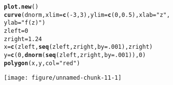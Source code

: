 \documentclass{article}\usepackage[]{graphicx}\usepackage[]{xcolor}
\makeatletter
\def\maxwidth{ %
  \ifdim\Gin@nat@width>\linewidth
    \linewidth
  \else
    \Gin@nat@width
  \fi
}
\newcommand{\hlnum}[1]{\textcolor[rgb]{0.686,0.059,0.569}{#1}}%
\newcommand{\hlsng}[1]{\textcolor[rgb]{0.192,0.494,0.8}{#1}}%
\newcommand{\hlopt}[1]{\textcolor[rgb]{0,0,0}{#1}}%
\newcommand{\hldef}[1]{\textcolor[rgb]{0.345,0.345,0.345}{#1}}%
\newcommand{\hlkwb}[1]{\textcolor[rgb]{0.69,0.353,0.396}{#1}}%
\newcommand{\hlkwc}[1]{\textcolor[rgb]{0.333,0.667,0.333}{#1}}%
\newcommand{\hlkwd}[1]{\textcolor[rgb]{0.737,0.353,0.396}{\textbf{#1}}}%
\newenvironment{kframe}{%
 \def\at@end@of@kframe{}%
 \ifinner\ifhmode%
  \def\at@end@of@kframe{\end{minipage}}%
  \begin{minipage}{\columnwidth}%
 \fi\fi%
 \def\FrameCommand##1{\hskip\@totalleftmargin \hskip-\fboxsep
 \colorbox{shadecolor}{##1}\hskip-\fboxsep
     \hskip-\linewidth \hskip-\@totalleftmargin \hskip\columnwidth}%
 \MakeFramed {\advance\hsize-\width
   \@totalleftmargin\z@ \linewidth\hsize
   \@setminipage}}%
 {\par\unskip\endMakeFramed%
 \at@end@of@kframe}
\newenvironment{knitrout}{}{} %
\makeatother
\begin{document}
\begin{knitrout}
\color{fgcolor}\begin{kframe}
\begin{alltt}
\hlkwd{plot.new}\hldef{()}
\hlkwd{curve}\hldef{(dnorm,} \hlkwc{xlim} \hldef{=} \hlkwd{c}\hldef{(}\hlopt{-}\hlnum{3}\hldef{,} \hlnum{3}\hldef{),} \hlkwc{ylim} \hldef{=} \hlkwd{c}\hldef{(}\hlnum{0}\hldef{,} \hlnum{0.5}\hldef{),} \hlkwc{xlab} \hldef{=} \hlsng{"z"}\hldef{,}
      \hlkwc{ylab}\hldef{=}\hlsng{"f(z)"}\hldef{)}
\hldef{zleft} \hlkwb{=} \hlnum{0}
\hldef{zright} \hlkwb{=} \hlnum{1.24}
\hldef{x} \hlkwb{=} \hlkwd{c}\hldef{(zleft,} \hlkwd{seq}\hldef{(zleft, zright,} \hlkwc{by}\hldef{=}\hlnum{.001}\hldef{), zright)}
\hldef{y} \hlkwb{=} \hlkwd{c}\hldef{(}\hlnum{0}\hldef{,} \hlkwd{dnorm}\hldef{(}\hlkwd{seq}\hldef{(zleft, zright,} \hlkwc{by}\hldef{=}\hlnum{.001}\hldef{)),} \hlnum{0}\hldef{)}
\hlkwd{polygon}\hldef{(x, y,} \hlkwc{col}\hldef{=}\hlsng{"red"}\hldef{)}
\end{alltt}
\end{kframe}
\texttt{[image: figure/unnamed-chunk-11-1]} 
\end{knitrout}
\end{document}
